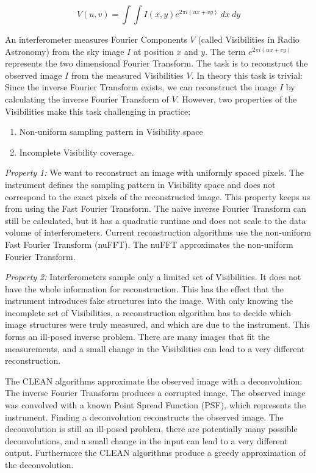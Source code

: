 \begin{equation}\label{intro:measurement}
V(u, v) = \int\int I(x, y) e^{2 \pi i (ux+vy)} \: dx \: dy
\end{equation}

An interferometer measures Fourier Components $V$ (called Visibilities in Radio Astronomy) from the sky image $I$ at position $x$ and $y$. The term $e^{2 \pi i (ux+vy)}$ represents the two dimensional Fourier Transform. The task is to reconstruct the observed image $I$ from the measured Visibilities $V$. In theory this task is trivial: Since the inverse Fourier Transform exists, we can reconstruct the image $I$ by calculating the inverse Fourier Transform of $V$. However, two properties of the Visibilities make this task challenging in practice:

\begin{enumerate}
	\item Non-uniform sampling pattern in Visibility space
	\item Incomplete Visibility coverage. 
\end{enumerate} 

\textit{Property 1:} We want to reconstruct an image with uniformly spaced pixels. The instrument defines the sampling pattern in Visibility space and does not correspond to the exact pixels of the reconstructed image. This property keeps us from using the Fast Fourier Transform. The naive inverse Fourier Transform can still be calculated, but it has a quadratic runtime and does not scale to the data volume of interferometers. Current reconstruction algorithms use the non-uniform Fast Fourier Transform (nuFFT). The nuFFT approximates the non-uniform Fourier Transform. 

\textit{Property 2:} Interferometers sample only a limited set of Visibilities. It does not have the whole information for reconstruction. This has the effect that the instrument introduces fake structures into the image. With only knowing the incomplete set of Visibilities, a reconstruction algorithm has to decide which image structures were truly measured, and which are due to the instrument. This forms an ill-posed inverse problem. There are many images that fit the measurements, and a small change in the Visibilities can lead to a very different reconstruction. 

The CLEAN algorithms approximate the observed image with a deconvolution: The inverse Fourier Transform produces a corrupted image. The observed image was convolved with a known Point Spread Function (PSF), which represents the instrument. Finding a deconvolution reconstructs the observed image. The deconvolution is still an ill-posed problem, there are potentially many possible deconvolutions, and a small change in the input can lead to a very different output. Furthermore the CLEAN algorithms produce a greedy approximation of the deconvolution. 

